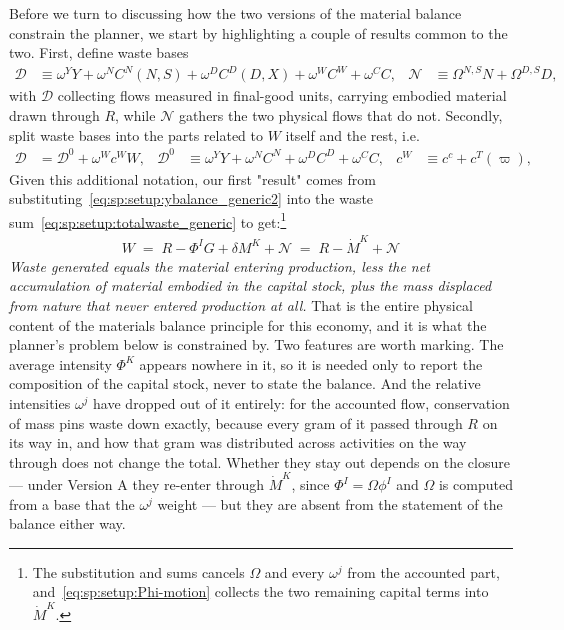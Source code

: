 Before we turn to discussing how the two versions of the material balance constrain the planner, we start by highlighting a couple of results common to the two. First, define waste bases 
\begin{align}
\mathcal D &\equiv \omega^YY+\omega^{N}C^N(N,S)+\omega^{D}C^D(D,X)+\omega^WC^W+\omega^CC,
&
\mathcal N &\equiv \Omega^{N,S}N+\Omega^{D,S}D,
\label{eq:sp:setup:base}
\end{align}
with $\mathcal D$ collecting flows measured in final-good units, carrying embodied material drawn through $R$, while $\mathcal N$ gathers the two physical flows that do not. Secondly, split waste bases into the parts related to $W$ itself and the rest, i.e.
\begin{align}
\mathcal D &= \mathcal D^0+\omega^Wc^WW,
&
\mathcal D^0 &\equiv \omega^YY+\omega^{N}C^N+\omega^{D}C^D+\omega^CC,
&
c^W &\equiv c^c+c^T(\varpi),
\label{eq:sp:setup:base-split}
\end{align}
Given this additional notation, our first "result" comes from substituting~\eqref{eq:sp:setup:ybalance_generic2} into the waste sum~\eqref{eq:sp:setup:totalwaste_generic} to get:\footnote{The substitution and sums cancels $\Omega$ and every $\omega^j$ from the accounted part, and~\eqref{eq:sp:setup:Phi-motion} collects the two remaining capital terms into $\dot M^K$.}
\begin{align}
\boxed{\;W \;=\; R-\Phi^IG+\delta M^K+\mathcal N \;=\; R-\dot M^K+\mathcal N\;}
\label{eq:sp:setup:ledger}
\end{align}
\emph{Waste generated equals the material entering production, less the net accumulation of material embodied in the capital stock, plus the mass displaced from nature that never entered production at all.} That is the entire physical content of the materials balance principle for this economy, and it is what the planner's problem below is constrained by. Two features are worth marking. The average intensity $\Phi^K$ appears nowhere in it, so it is needed only to report the composition of the capital stock, never to state the balance. And the relative intensities $\omega^j$ have dropped out of it entirely: for the accounted flow, conservation of mass pins waste down exactly, because every gram of it passed through $R$ on its way in, and how that gram was distributed across activities on the way through does not change the total. Whether they stay out depends on the closure --- under Version A they re-enter through $\dot M^K$, since $\Phi^I=\Omega\phi^I$ and $\Omega$ is computed from a base that the $\omega^j$ weight --- but they are absent from the statement of the balance either way.


